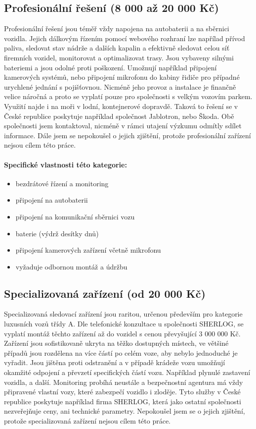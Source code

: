 \documentclass[FM,BP]{tulthesis}  %
\begin{document}
\subsection{Profesionální řešení (8 000 až 20 000 Kč)}
Profesionální řešení jsou téměř vždy napojena na autobaterii a na sběrnici vozidla. Jejich dálkovým řízením pomocí webového rozhraní lze napřílad přívod paliva, sledovat stav nádrže a dalších kapalin a efektivně sledovat celou síť firemních vozidel, monitorovat a optimalizovat trasy. Jsou vybaveny silnými bateriemi a jsou odolné proti poškození. Umožnují například připojení kamerových systémů, nebo připojení mikrofonu do kabiny řidiče pro případné urychlené jednání s pojišťovnou. Nicméně jeho provoz a instalace je finančně velice náročná a proto se vyplatí pouze pro společnosti s velkým vozovím parkem. Využití najde i na moři v lodní, kontejnerové dopravdě. Taková to řešení se v České republice poskytuje například společnost Jablotron, nebo Škoda. Obě společnosti jsem kontaktoval, nicméně v rámci utajení výzkumu odmítly sdílet informace. Dále jsem se nepokoušel o jejich zjištění, protože profesionální zařízení nejsou cílem této práce. 

\paragraph{Specifické vlastnosti této kategorie:}
\begin{itemize}
\item bezdrátové řízení a monitoring
\item připojení na autobaterii
\item připojení na komunikační sběrnici vozu
\item baterie (výdrž desítky dnů)
\item připojení kamerových zařízení včetně mikrofonu
\item vyžaduje odbornou montáž a údržbu
\end{itemize}

\subsection{Specializovaná zařízení (od 20 000 Kč)}
Specializovaná sledovací zařízení jsou raritou, určenou především pro kategorie luxusních vozů třídy A. Dle telefonické konzultace u společnosti SHERLOG, se vyplatí montáž těchto zařízení až do vozidel s cenou převyšující 3 000 000 Kč. Zařízení jsou sofistikovaně ukryta na těžko dostupných místech, ve většiné případů jsou rozdělena na více částí po celém voze, aby nebylo jednoduché je vyřadit. Jsou jištěna proti odstranění a v případě krádeže vozu umožňují okamžité odpojení a převzetí specifických částí vozu. Například plynulé zastavení vozidla, a další. Monitoring probíhá neustále a bezpečnostní agentura má vždy připravené vlastní vozy, které zabezpečí vozidlo i zloděje. Tyto služby v České republice poskytuje například firma SHERLOG, která jako ostatní společnosti nezveřejňuje ceny, ani technické parametry. Nepokoušel jsem se o jejich zjištění, protože specializovaná zařízení nejsou cílem této práce. 
\end{document}
